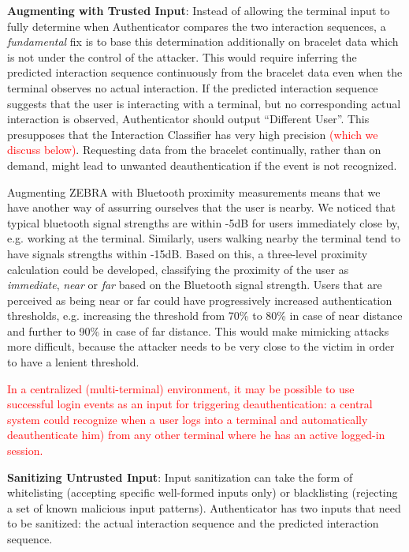\documentclass[conference]{IEEEtran}
\newcommand\changeAsokan[1]{\textcolor{red}{#1}}
\newcommand\changeAsokan[1]{{#1}}
\begin{document}
\vspace{1mm}
\noindent\textbf{Augmenting with Trusted Input}: Instead of allowing the terminal input to fully determine when Authenticator compares the two interaction sequences, a \textit{fundamental} fix is to base this determination additionally on bracelet data which is not under the control of the attacker. This would require inferring the predicted interaction sequence continuously from the bracelet data even when the terminal observes no actual interaction. If the predicted interaction sequence suggests that the user is interacting with a terminal, but no corresponding actual interaction is observed, Authenticator should output ``Different User''. This presupposes that the Interaction Classifier has very high precision \changeAsokan{(which we discuss below)}. 
Requesting data from the bracelet continually, rather than on demand, might lead to unwanted deauthentication if the event is not recognized.

Augmenting ZEBRA with Bluetooth proximity measurements means that we have another way of assurring ourselves that the user is nearby. We noticed that typical bluetooth signal strengths are within -5dB for users immediately close by, e.g. working at the terminal. Similarly, users walking nearby the terminal tend to have signals strengths within -15dB. Based on this, a three-level proximity calculation could be developed, classifying the proximity of the user as \textit{immediate}, \textit{near} or \textit{far} based on the Bluetooth signal strength. Users that are perceived as being near or far could have progressively increased authentication thresholds, e.g. increasing the threshold from 70\% to 80\% in case of near distance and further to 90\% in case of far distance. This would make mimicking attacks more difficult, because the attacker needs to be very close to the victim in order to have a lenient threshold.

\changeAsokan{In a centralized (multi-terminal) environment, it may be possible to use successful login events as an input for triggering deauthentication: a central system could recognize when a user logs into a terminal and automatically deauthenticate him) from any other terminal where he has an active logged-in session.}




\vspace{1mm}
\noindent\textbf{Sanitizing Untrusted Input}: Input sanitization can take the form of whitelisting (accepting specific well-formed inputs only) or blacklisting (rejecting a set of known malicious input patterns). Authenticator has two inputs that need to be sanitized: the actual interaction sequence and the predicted interaction sequence.
\end{document}
